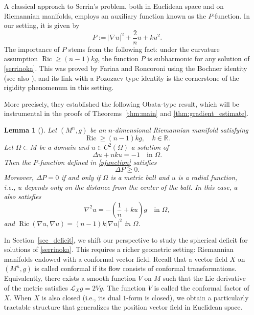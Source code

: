 \documentclass[reqno,11pt]{amsart}
\numberwithin{equation}{section}  %
\newtheorem{lemma}[theorem]{Lemma}
\begin{document}
A classical approach to Serrin's problem, both in Euclidean space and on Riemannian manifolds, employs an auxiliary function known as the $P$-function. In our setting, it is given by
\begin{equation}\label{pfunction}
P := |\nabla u|^2 + \dfrac{2}{n}u + ku^2.
\end{equation}
The importance of $P$ stems from the following fact: under the curvature assumption $\operatorname{Ric} \geq (n-1)k g$, the function $P$ is subharmonic for any solution of \eqref{serrinoka}. This was proved by Farina and Roncoroni \cite{farina2022} using the Bochner identity (see also \cite{ciraolo}), and its link with a Pozozaev-type identity is the cornerstone of the rigidity phenomenum in this setting.

More precisely, they established the following Obata-type result, which will be instrumental in the proofs of Theorems~\ref{thm:main} and \ref{thm:gradient_estimate}.

\begin{lemma}[\cite{farina2022}]\label{farina-roncoroni}
Let $(M^{n},g)$ be an $n$-dimensional Riemannian manifold satisfying  
\begin{equation}\label{ricci_bound}
\operatorname{Ric} \geq (n-1)k g, \quad k \in \mathbb{R}.    
\end{equation}
Let $\Omega \subset M$ be a domain and $u \in C^{2}(\Omega)$ a solution of 
\[
\Delta u + nku = -1 \quad \text{in } \Omega.
\]
Then the $P$-function defined in \eqref{pfunction} satisfies 
\[
\Delta P \geq 0.
\]
Moreover, $\Delta P= 0$ if and only if $\Omega$ is a metric ball and $u$ is a radial function, i.e., $u$ depends only on the distance from the center of the ball. In this case, $u$ also satisfies
\[
\nabla^2 u = -\left(\frac{1}{n} + ku\right)g \quad \text{in } \Omega,
\]
and $\operatorname{Ric}(\nabla u, \nabla u) = (n-1)k|\nabla u|^2$ in $\Omega$.
\end{lemma}

In Section~\ref{sec_deficit}, we shift our perspective to study the spherical deficit for solutions of \eqref{serrinoka}. This requires a richer geometric setting: Riemannian manifolds endowed with a conformal vector field. Recall that a vector field $X$ on $(M^n,g)$ is called conformal if its flow consists of conformal transformations. Equivalently, there exists a smooth function $V$ on $M$ such that the Lie derivative of the metric satisfies $\mathcal{L}_X g = 2V g$. The function $V$ is called the conformal factor of $X$. When $X$ is also closed (i.e., its dual $1$-form is closed), we obtain a particularly tractable structure that generalizes the position vector field in Euclidean space.
\end{document}
